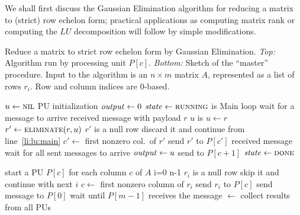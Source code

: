 We shall first discuss the Gaussian Elimination algorithm for reducing
a matrix to (strict) row echelon form; practical applications as
computing matrix rank or computing the $LU$ decomposition will follow 
by simple modifications.
\begin{Algorithm}
  \caption{Reduce a matrix to strict row echelon form by Gaussian
    Elimination. \emph{Top:} Algorithm run by processing unit $P[c]$.
    \emph{Bottom:} Sketch of the ``master'' procedure.  Input to the
    algorithm is an $n \times m$ matrix $A$, represented as a list of
    rows $r_i$. Row and column indices are $0$-based.}
  \label{alg:echelon}
  \begin{codebox}
    \li $u \gets \textnormal{\scshape nil}$ \RComment PU initialization
    \li $\id{output} \gets 0$
    \li $\id{state} \gets \const{running}$
    \li \While {} is           \label{li:lu:main}
    \RComment Main loop
    \li \Do wait for a message to arrive
    \li   \If received message  with payload $r$
    \li   \Then
    \li     \If $u$ is \nil
    \li     \Then 
              $u \gets r$
    \li     \Else \label{li:pu:elimination}
              $r' \gets \textnormal{\scshape eliminate}(r,u)$
    \li       \If $r'$ is a null row 
    \li       \Then
                discard it and continue from line~\ref{li:lu:main}
              \End %
    \li       $c' \gets$ first nonzero col.~of $r'$
    \li       send $r'$ to $P[c']$
            \End
    \li   \ElseIf received message 
    \li   \Then 
            wait for all sent messages to arrive
    \li     $\id{output} \gets u$                     \label{li:pu:result}
    \li     send  to $P[c+1]$
    \li     $\id{state} \gets \const{done}$
          \End%
        \End%
    \li \Return {}
    \end{codebox}
    \begin{codebox}
    \li start a PU $P[c]$ for each column $c$ of $A$  \label{li:master:start}
    \li \For i=0 \To n-1                              \label{li:master:read1}
    \li \Do
    \li   \If $r_i$ is a null row 
    \li   \Then
            skip it and continue with next $i$
          \End %
    \li   $c \gets$ first nonzero column of $r_i$
    \li   send $r_i$ to $P[c]$                        \label{li:master:read2}
        \End %
    \li send  message to $P[0]$            \label{li:master:core1}
    \li wait until $P[m-1]$ receives the  message
                                                      \label{li:master:core2}
    \li {} $\gets$ collect  results from all PUs
                                                      \label{li:master:result}
    \li \Return {}                           \label{li:master:end}
  \end{codebox}
\end{Algorithm}

